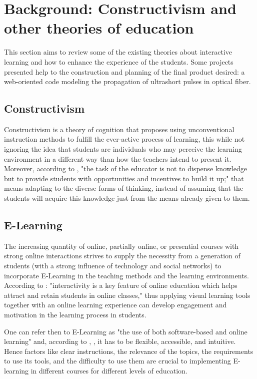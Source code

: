 \section{Background: Constructivism and other theories of education}
This section aims to review some of the existing theories about interactive learning and how to enhance the experience of the students. Some projects presented help to the construction and planning of the final product desired: a web-oriented code modeling the propagation of ultrashort pulses in optical fiber.



\subsection{Constructivism}
Constructivism is a theory of cognition that proposes using unconventional instruction methods to fulfill the ever-active process of learning, this while not ignoring the idea that students are individuals who may perceive the learning environment in a different way than how the teachers intend to present it. Moreover, according to \cite{fosnot2013constructivism}, "the task of the educator is not to dispense knowledge but to provide students with opportunities and incentives to build it up;" that means adapting to the diverse forms of thinking, instead of assuming that the students will acquire this knowledge just from the means already given to them.


\subsection{E-Learning}
The increasing quantity of online, partially online, or presential courses with strong online interactions strives to supply the necessity from a generation of students (with a strong influence of technology and social networks) to incorporate E-Learning in the teaching methods and the learning environments.  According to \cite{vltool}: "interactivity is a key feature of online education which helps attract and retain students in online classes," thus applying visual learning tools together with an online learning experience can develop engagement and motivation in the learning process in students. 

One can refer then to E-Learning as "the use of both software-based and online learning"  \cite{tabak} and, according to \cite{tabak}, \cite{munoz}, it has to be flexible, accessible, and intuitive. Hence factors like clear instructions, the relevance of the topics, the requirements to use its tools, and the difficulty to use them are crucial to implementing E-learning in different courses for different levels of education.

